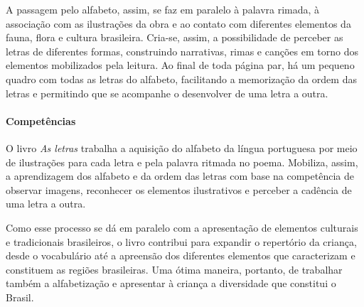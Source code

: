 \documentclass[11pt]{extarticle}
\begin{document}
A passagem pelo alfabeto, assim, se faz em paralelo à palavra rimada, à associação com as ilustrações da obra e ao contato com diferentes elementos da fauna, flora e cultura brasileira. Cria-se, assim, a possibilidade de perceber as letras de diferentes formas, construindo narrativas, rimas e canções em torno dos elementos mobilizados pela leitura. Ao final de toda página par, há um pequeno quadro com todas as letras do alfabeto, facilitando a memorização da ordem das letras e permitindo que se acompanhe o desenvolver de uma letra a outra.

\paragraph{Competências}
O livro \textit{As letras} trabalha a aquisição do alfabeto da língua portuguesa por meio de ilustrações para cada letra e pela palavra ritmada no poema. Mobiliza, assim, a aprendizagem dos alfabeto e da ordem das letras com base na competência de observar imagens, reconhecer os elementos ilustrativos e perceber a cadência de uma letra a outra.

Como esse processo se dá em paralelo com a apresentação de elementos culturais e tradicionais brasileiros, o livro contribui para expandir o repertório da criança, desde o vocabulário até a apreensão dos diferentes elementos que caracterizam e constituem as regiões brasileiras. Uma ótima maneira, portanto, de trabalhar também a alfabetização e apresentar à criança a diversidade que constitui o Brasil.

\reversemarginpar
\marginparwidth=5cm
\end{document}

